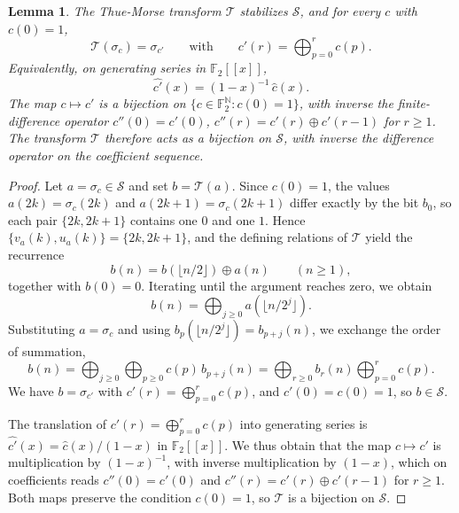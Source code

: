 \documentclass[12pt,reqno]{article}
\newcommand{\N}{\mathbb{N}}
\theoremstyle{plain}
\newtheorem{lemma}[theorem]{Lemma}
\theoremstyle{definition}
\begin{document}
\begin{lemma}
\label{lem:action-algebrique}
The Thue-Morse transform $\mathcal{T}$ stabilizes $\mathcal{S}$, and for every $c$ with $c(0) = 1$,
\[
  \mathcal{T}(\sigma_c) = \sigma_{c'} \qquad \text{with} \qquad c'(r) = \bigoplus_{p=0}^{r} c(p).
\]
Equivalently, on generating series in $\mathbb{F}_2[[x]]$,
\[
  \widehat{c'}(x) = (1-x)^{-1}\, \widehat{c}(x).
\]
The map $c \mapsto c'$ is a bijection on $\{c \in \mathbb{F}_2^{\N} : c(0) = 1\}$, with inverse the finite-difference operator $c''(0) = c'(0)$, $c''(r) = c'(r) \oplus c'(r-1)$ for $r \ge 1$. The transform $\mathcal{T}$ therefore acts as a bijection on $\mathcal{S}$, with inverse the difference operator on the coefficient sequence.
\end{lemma}

\begin{proof}
Let $a = \sigma_c \in \mathcal{S}$ and set $b = \mathcal{T}(a)$. Since $c(0) = 1$, the values $a(2k) = \sigma_c(2k)$ and $a(2k+1) = \sigma_c(2k+1)$ differ exactly by the bit $b_0$, so each pair $\{2k, 2k+1\}$ contains one $0$ and one $1$. Hence $\{v_a(k), u_a(k)\} = \{2k, 2k+1\}$, and the defining relations of $\mathcal{T}$ yield the recurrence
\[
  b(n) = b(\lfloor n/2 \rfloor) \oplus a(n) \qquad (n \ge 1),
\]
together with $b(0) = 0$. Iterating until the argument reaches zero, we obtain
\[
  b(n) = \bigoplus_{j \ge 0} a(\lfloor n/2^j \rfloor).
\]
Substituting $a = \sigma_c$ and using $b_p(\lfloor n/2^j \rfloor) = b_{p+j}(n)$, we exchange the order of summation,
\[
  b(n) = \bigoplus_{j \ge 0} \bigoplus_{p \ge 0} c(p)\, b_{p+j}(n) = \bigoplus_{r \ge 0} b_r(n) \bigoplus_{p = 0}^{r} c(p).
\]
We have $b = \sigma_{c'}$ with $c'(r) = \bigoplus_{p=0}^{r} c(p)$, and $c'(0) = c(0) = 1$, so $b \in \mathcal{S}$.

The translation of $c'(r) = \bigoplus_{p=0}^{r} c(p)$ into generating series is $\widehat{c'}(x) = \widehat{c}(x) / (1-x)$ in $\mathbb{F}_2[[x]]$. We thus obtain that the map $c \mapsto c'$ is multiplication by $(1-x)^{-1}$, with inverse multiplication by $(1-x)$, which on coefficients reads $c''(0) = c'(0)$ and $c''(r) = c'(r) \oplus c'(r-1)$ for $r \ge 1$. Both maps preserve the condition $c(0) = 1$, so $\mathcal{T}$ is a bijection on $\mathcal{S}$.
\end{proof}
\end{document}
